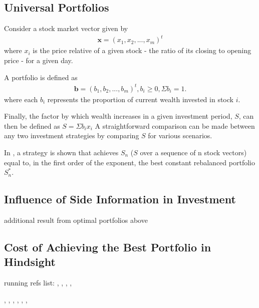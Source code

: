 \documentclass[10pt, twocolumn]{IEEEtran}
\begin{document}
\subsection{Universal Portfolios}
Consider a stock market vector given by
\begin{gather*}
  \boldsymbol{x} = (x_{1}, x_{2}, ..., x_{m})^{t}
\end{gather*}
where $x_{i}$ is the price relative of a given stock - the ratio of its closing to opening price - for a given day.

A portfolio is defined as
\begin{gather*}
  \boldsymbol{b} = (b_{1}, b_{2}, ..., b_{m})^{t}, b_{i} \ge 0, \Sigma b_{i} = 1.
\end{gather*}
where each $b_{i}$ represents the proportion of current wealth invested in stock $i$.

Finally, the factor by which wealth increases
in a given investment period, $S$, can then be defined as $ S = \Sigma b_{i}x_{i} $
A straightforward comparison can be made between any two investment strategies by comparing $S$ for various scenarios.

In \cite{universal}, a strategy is shown that achieves $S_{n}$ ($S$ over a sequence of n stock vectors) equal to,%
in the first order of the exponent, the best constant rebalanced portfolio $S^{*}_{n}$. 



\subsection{Influence of Side Information in Investment}
additional result from optimal portfolios above
\subsection{Cost of Achieving the Best Portfolio in Hindsight}





running refs list: \cite{RePEc:eee:monchp:3-04}, \cite{Burnham2011}, \cite{Cover2005}, \cite{Cover1988},

\cite{Cover1998}, \cite{Li2017}, \cite{Sims2003}, \cite{Woodford2009}, \cite{Hansen2010}, \cite{StochasticGames},

\cite{Pesaran1995}


 
\baselineskip=2pt


\end{document}
